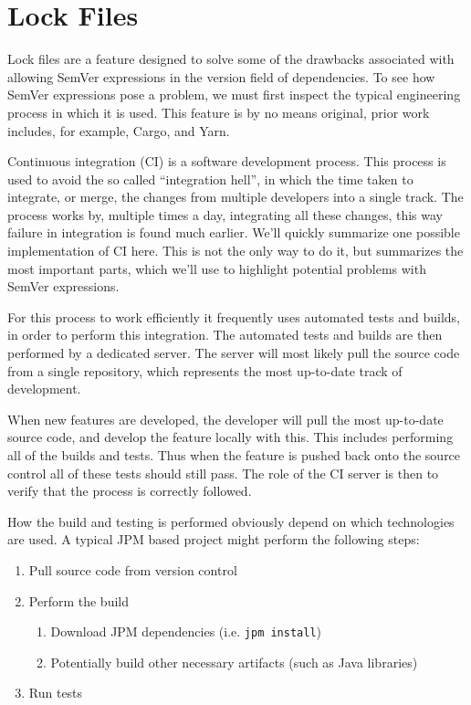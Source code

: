 \section{Lock Files}


Lock files are a feature designed to solve some of the drawbacks associated
with allowing SemVer expressions in the version field of dependencies. To see
how SemVer expressions pose a problem, we must first inspect the typical
engineering process in which it is used. This feature is by no means original,
prior work includes, for example, Cargo, and Yarn. %

Continuous integration (CI) is a software development process. This process is
used to avoid the so called ``integration hell'', in which the time taken to
integrate, or merge, the changes from multiple developers into a single track.
The process works by, multiple times a day, integrating all these changes, this
way failure in integration is found much earlier. We'll quickly summarize one
possible implementation of CI here. This is not the only way to do it, but
summarizes the most important parts, which we'll use to highlight potential
problems with SemVer expressions.

For this process to work efficiently it frequently uses automated tests and
builds, in order to perform this integration. The automated tests and builds
are then performed by a dedicated server. The server will most likely pull the
source code from a single repository, which represents the most up-to-date
track of development.

When new features are developed, the developer will pull the most up-to-date
source code, and develop the feature locally with this. This includes
performing all of the builds and tests. Thus when the feature is pushed back
onto the source control all of these tests should still pass. The role of the
CI server is then to verify that the process is correctly followed.

How the build and testing is performed obviously depend on which technologies
are used. A typical JPM based project might perform the following steps:

\begin{enumerate}
\item Pull source code from version control
\item Perform the build
    \begin{enumerate}
        \item Download JPM dependencies (i.e. \verb!jpm install!)
        \item Potentially build other necessary artifacts (such as Java
                libraries)
    \end{enumerate}
\item Run tests
\end{enumerate}

